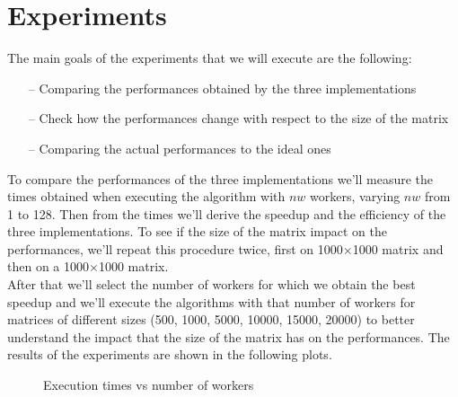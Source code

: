 \documentclass[12pt]{article}
\begin{document}
	\section{Experiments}
	The main goals of the experiments that we will execute are the following: 
	\begin{itemize}
		\item[--] Comparing the performances obtained by the three implementations 
		\item[--] Check how the performances change with respect to the size of the matrix
		\item[--] Comparing the actual performances to the ideal ones
	\end{itemize}
	To compare the performances of the three implementations we'll measure the times obtained when executing the algorithm with $nw$ workers, varying $nw$ from 1 to 128. Then from the times we'll derive the speedup and the efficiency of the three implementations. To see if the size of the matrix impact on the performances, we'll repeat this procedure twice, first on 1000$\times$1000 matrix and then on a 1000$\times$1000 matrix.\\
	After that we'll select the number of workers for which we obtain the best speedup and we'll execute the algorithms with that number of workers for matrices of different sizes (500, 1000, 5000, 10000, 15000, 20000) to better understand the impact that the size of the matrix has on the performances. The results of the experiments are shown in the following plots.
	\iffalse
	\begin{figure}[H]
		\centering
		\qquad
		\caption{Execution times vs number of workers}%
		\label{fig:time}%
	\end{figure}
	
\end{document}
